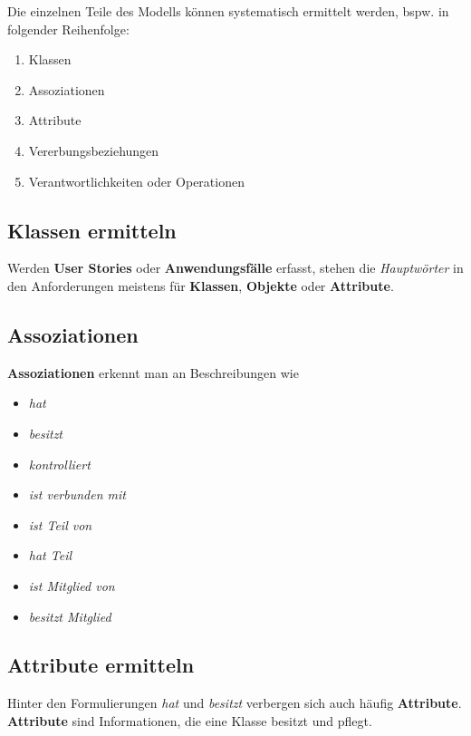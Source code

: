 \noindent
Die einzelnen Teile des Modells können systematisch ermittelt werden, bspw. in folgender Reihenfolge:

\begin{enumerate}
    \item Klassen
    \item Assoziationen
    \item Attribute
    \item Vererbungsbeziehungen
    \item Verantwortlichkeiten oder Operationen
\end{enumerate}

\subsection*{Klassen ermitteln}
Werden \textbf{User Stories} oder \textbf{Anwendungsfälle} erfasst, stehen die \textit{Hauptwörter} in den Anforderungen meistens für \textbf{Klassen}, \textbf{Objekte} oder \textbf{Attribute}.

\subsection*{Assoziationen}
\textbf{Assoziationen} erkennt man an Beschreibungen wie
\begin{itemize}
    \item \textit{hat}
    \item \textit{besitzt}
    \item \textit{kontrolliert}
    \item \textit{ist verbunden mit}
    \item \textit{ist Teil von}
    \item \textit{hat Teil}
    \item \textit{ist Mitglied von}
    \item \textit{besitzt Mitglied}
\end{itemize}

\subsection*{Attribute ermitteln}

\noindent
Hinter den Formulierungen \textit{hat} und \textit{besitzt} verbergen sich auch häufig \textbf{Attribute}.\\

\noindent
\textbf{Attribute} sind Informationen, die eine Klasse besitzt und pflegt.

